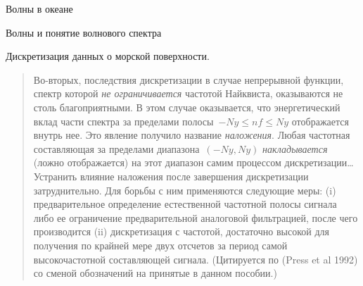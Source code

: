 \begin{chapter}{Волны в океане}
\begin{section}{Волны и понятие волнового спектра}
\begin{paragraph}{Дискретизация данных о морской поверхности.}
\begin{quotation}
Во-вторых, последствия дискретизации в случае непрерывной функции, спектр
которой \emph{не ограничивается} частотой Найквиста, оказываются не столь
благоприятными. В этом случае оказывается, что энергетический вклад части
спектра за пределами полосы~$-Ny \le nf \le Ny$ отображается внутрь нее.
Это явление получило название \emph{наложения}. Любая частотная составляющая
за пределами диапазона~$(-Ny, Ny)$ \emph{накладывается} (ложно отображается)
на этот диапазон самим процессом дискретизации\dots{}
Устранить влияние наложения после завершения дискретизации затруднительно.
Для борьбы с ним применяются следующие меры:
(i) предварительное определение естественной частотной полосы сигнала
либо ее ограничение предварительной аналоговой фильтрацией, после чего 
производится (ii) дискретизация с частотой, достаточно высокой для получения
по крайней мере двух отсчетов за период самой высокочастотной составляющей 
сигнала. (Цитируется по (Press et al 1992) со сменой обозначений на принятые
в данном пособии.)
%
\end{quotation}


\end{paragraph}
\end{section}
\end{chapter}
